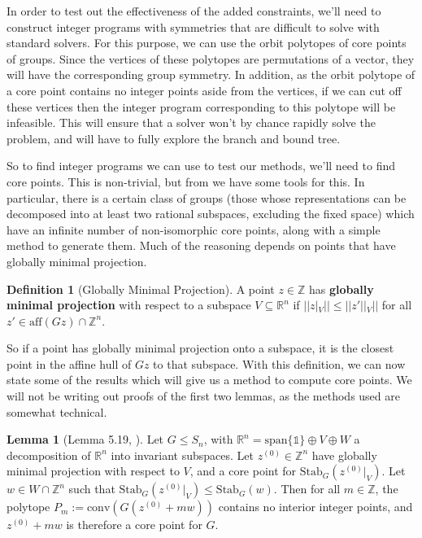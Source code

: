 \documentclass[11pt]{article} %
\theoremstyle{definition}
\newtheorem{definition}[theorem]{Definition}
\newtheorem{lemma}[theorem]{Lemma}
\theoremstyle{remark}
\newcommand{\ZZ}{\mathbb{Z}}
\newcommand{\RR}{\mathbb{R}}
\newcommand{\myspan}[1]{\textrm{span} \lbrace {#1} \rbrace}
\newcommand{\stab}[2]{\textrm{Stab}_{#1}({#2})}
\begin{document}
In order to test out the effectiveness of the added constraints, we'll need to construct integer programs with symmetries that are difficult to solve with standard solvers. For this purpose, we can use the orbit polytopes of core points of groups. Since the vertices of these polytopes are permutations of a vector, they will have the corresponding group symmetry. In addition, as the orbit polytope of a core point contains no integer points aside from the vertices, if we can cut off these vertices then the integer program corresponding to this polytope will be infeasible. This will ensure that a solver won't by chance rapidly solve the problem, and will have to fully explore the branch and bound tree.

So to find integer programs we can use to test our methods, we'll need to find core points. This is non-trivial, but from \cite{rehn} we have some tools for this. In particular, there is a certain class of groups (those whose representations can be decomposed into at least two rational subspaces, excluding the fixed space) which have an infinite number of non-isomorphic core points, along with a simple method to generate them. Much of the reasoning depends on points that have globally minimal projection.

\begin{definition}[Globally Minimal Projection]
A point $z \in \ZZ$ has \textbf{globally minimal projection} with respect to a subspace $V \subseteq \mathbb{R}^n$ if $||z|_V|| \leq ||z'||_V||$ for all $z' \in \textrm{aff}(Gz) \cap \mathbb{Z}^n$.
\end{definition}

So if a point has globally minimal projection onto a subspace, it is the closest point in the affine hull of $Gz$ to that subspace. With this definition, we can now state some of the results which will give us a method to compute core points. We will not be writing out proofs of the first two lemmas, as the methods used are somewhat technical.

\begin{lemma}[Lemma 5.19, \cite{rehn}] \label{infcplemma}
Let $G \leq S_n$, with $\RR^n = \myspan{\mathds{1}} \oplus V \oplus W$ a decomposition of $\RR^n$ into invariant subspaces. Let $z^(0) \in \ZZ^n$ have globally minimal projection with respect to $V$, and a core point for $\stab{G}{z^{(0)}|_V}$. Let $w \in W \cap \ZZ^n$ such that $\stab{G}{z^{(0)}|_V} \leq \stab{G}{w}$. Then for all $m \in \ZZ$, the polytope $P_m := \textrm{conv}(G(z^{(0)} + mw))$ contains no interior integer points, and $z^{(0)} + mw$ is therefore a core point for $G$.
\end{lemma}
\end{document}
